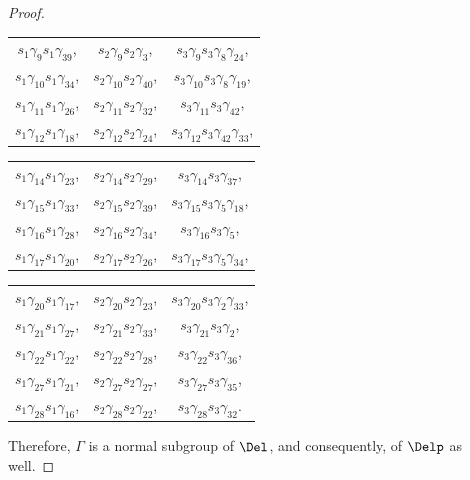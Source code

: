 \begin{proof}
\begin{center}
\begin{tabular}{ccc}
$s_1\gamma_{9}s_1\gamma_{39}$,  &$s_2\gamma_{9}s_2\gamma_{3}$,  &$s_3\gamma_{9}s_3\gamma_{8}\gamma_{24}$, \\
$s_1\gamma_{10}s_1\gamma_{34}$,  &$s_2\gamma_{10}s_2\gamma_{40}$,  &$s_3\gamma_{10}s_3\gamma_{8}\gamma_{19}$, \\
$s_1\gamma_{11}s_1\gamma_{26}$,  &$s_2\gamma_{11}s_2\gamma_{32}$,  &$s_3\gamma_{11}s_3\gamma_{42}$, \\
$s_1\gamma_{12}s_1\gamma_{18}$,  &$s_2\gamma_{12}s_2\gamma_{24}$,  &$s_3\gamma_{12}s_3\gamma_{42}\gamma_{33}$,\\
\end{tabular}
\end{center}
\begin{center}
\begin{tabular}{ccc}
$s_1\gamma_{14}s_1\gamma_{23}$,  &$s_2\gamma_{14}s_2\gamma_{29}$,  &$s_3\gamma_{14}s_3\gamma_{37}$, \\
$s_1\gamma_{15}s_1\gamma_{33}$,  &$s_2\gamma_{15}s_2\gamma_{39}$,  &$s_3\gamma_{15}s_3\gamma_{5}\gamma_{18}$, \\
$s_1\gamma_{16}s_1\gamma_{28}$,  &$s_2\gamma_{16}s_2\gamma_{34}$,  &$s_3\gamma_{16}s_3\gamma_{5}$, \\
$s_1\gamma_{17}s_1\gamma_{20}$,  &$s_2\gamma_{17}s_2\gamma_{26}$,  &$s_3\gamma_{17}s_3\gamma_{5}\gamma_{34}$, \\
\end{tabular}
\end{center}
\begin{center}
\begin{tabular}{ccc}
$s_1\gamma_{20}s_1\gamma_{17}$,  &$s_2\gamma_{20}s_2\gamma_{23}$,  &$s_3\gamma_{20}s_3\gamma_{2}\gamma_{33}$, \\
$s_1\gamma_{21}s_1\gamma_{27}$,  &$s_2\gamma_{21}s_2\gamma_{33}$,  &$s_3\gamma_{21}s_3\gamma_{2}$, \\
$s_1\gamma_{22}s_1\gamma_{22}$,  &$s_2\gamma_{22}s_2\gamma_{28}$,  &$s_3\gamma_{22}s_3\gamma_{36}$, \\
$s_1\gamma_{27}s_1\gamma_{21}$,  &$s_2\gamma_{27}s_2\gamma_{27}$,  &$s_3\gamma_{27}s_3\gamma_{35}$, \\
$s_1\gamma_{28}s_1\gamma_{16}$,  &$s_2\gamma_{28}s_2\gamma_{22}$,  &$s_3\gamma_{28}s_3\gamma_{32}$.
\end{tabular}
\end{center}

Therefore, $\Gamma$ is a normal subgroup of $\Del$, and consequently, of $\Delp$ as well.
\end{proof}

